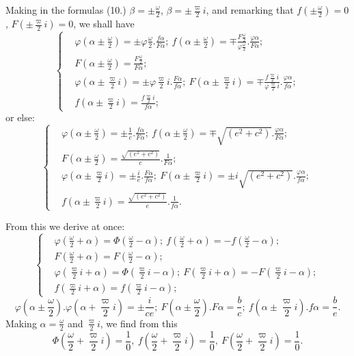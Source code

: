 \documentclass{article}
\begin{document}
Making in the formulas (10.) $\beta=\pm\frac{\omega}{2}$, $\beta=\pm\frac{\varpi}{2}i$, and remarking that $f\left(\pm\frac{\omega}{2}\right)=0$, $F\left(\pm\frac{\varpi}{2}i\right)=0$, we shall have
\[ \left\{\begin{aligned} &\varphi\left(\alpha\pm\frac{\omega}{2}\right)=\pm\varphi\frac{\omega}{2}.\frac{f\alpha}{F\alpha};\ f\left(\alpha\pm\frac{\omega}{2}\right)=\mp\frac{F\frac{\omega}{2}}{\varphi\frac{\omega}{2}}.\frac{\varphi\alpha}{F\alpha};\\ &F\left(\alpha\pm\frac{\omega}{2}\right)=\frac{F\frac{\omega}{2}}{F\alpha};\\ &\varphi\left(\alpha\pm\frac{\varpi}{2}i\right)=\pm\varphi\frac{\varpi}{2}i.\frac{F\alpha}{f\alpha};\ F\left(\alpha\pm\frac{\varpi}{2}i\right)=\mp\frac{f\frac{\varpi}{2}i}{\varphi\frac{\varpi}{2}i}.\frac{\varphi\alpha}{f\alpha};\\ &f\left(\alpha\pm\frac{\varpi}{2}i\right)=\frac{f\frac{\varpi}{2}i}{f\alpha}; \end{aligned}\right. \tag{15.} \]
or else:
\[ \left\{\begin{aligned} &\varphi\left(\alpha\pm\frac{\omega}{2}\right)=\pm\frac{1}{c}.\frac{f\alpha}{F\alpha};\ f\left(\alpha\pm\frac{\omega}{2}\right)=\mp\sqrt{(e^{2}+c^{2})}.\frac{\varphi\alpha}{F\alpha};\\ &F\left(\alpha\pm\frac{\omega}{2}\right)=\frac{\sqrt{(e^{2}+c^{2})}}{c}.\frac{1}{F\alpha};\\ &\varphi\left(\alpha\pm\frac{\varpi}{2}i\right)=\pm\frac{i}{e}.\frac{F\alpha}{f\alpha};\ F\left(\alpha\pm\frac{\varpi}{2}i\right)=\pm i\sqrt{(e^{2}+c^{2})}.\frac{\varphi\alpha}{f\alpha};\\ &f\left(\alpha\pm\frac{\varpi}{2}i\right)=\frac{\sqrt{(e^{2}+c^{2})}}{e}.\frac{1}{f\alpha}. \end{aligned}\right. \tag{16.} \]

From this we derive at once:
\[ \left\{\begin{aligned} &\varphi\left(\frac{\omega}{2}+\alpha\right)=\Phi\left(\frac{\omega}{2}-\alpha\right);\ f\left(\frac{\omega}{2}+\alpha\right)=-f\left(\frac{\omega}{2}-\alpha\right);\\ &F\left(\frac{\omega}{2}+\alpha\right)=F\left(\frac{\omega}{2}-\alpha\right);\\ &\varphi\left(\frac{\varpi}{2}i+\alpha\right)=\Phi\left(\frac{\varpi}{2}i-\alpha\right);\ F\left(\frac{\varpi}{2}i+\alpha\right)=-F\left(\frac{\varpi}{2}i-\alpha\right);\\ &f\left(\frac{\varpi}{2}i+\alpha\right)=f\left(\frac{\varpi}{2}i-\alpha\right); \end{aligned}\right. \tag{17.} \]
\[ \varphi\left(\alpha\pm\frac{\omega}{2}\right).\varphi\left(\alpha+\frac{\varpi}{2}i\right)=\pm\frac{i}{ce};\ F\left(\alpha\pm\frac{\omega}{2}\right).F\alpha=\frac{b}{c};\ f\left(\alpha\pm\frac{\varpi}{2}i\right).f\alpha=\frac{b}{e}. \tag{18.} \]
Making $\alpha=\frac{\omega}{2}$ and $\frac{\varpi}{2}i$, we find from this
\[ \Phi\left(\frac{\omega}{2}+\frac{\varpi}{2}i\right)=\frac{1}{0},\ f\left(\frac{\omega}{2}+\frac{\varpi}{2}i\right)=\frac{1}{0},\ F\left(\frac{\omega}{2}+\frac{\varpi}{2}i\right)=\frac{1}{0}. \]
\end{document}
